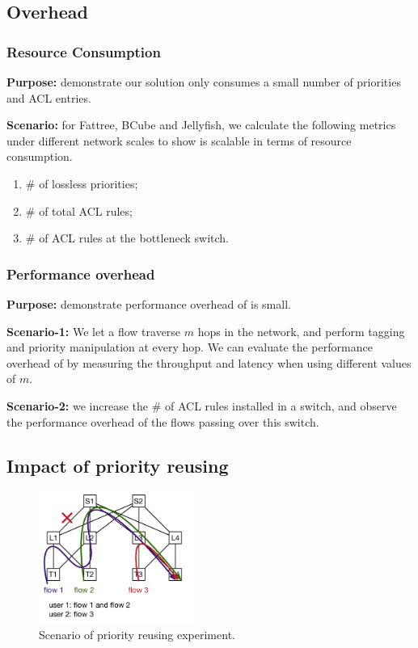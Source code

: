 \subsection{Overhead}\label{subsec:exp_overhead}

\subsubsection{Resource Consumption}\label{subsec:exp_resourceconsump}

\textbf{Purpose:} demonstrate our solution only consumes a small number of priorities and ACL entries.

\textbf{Scenario:} for Fattree, BCube and Jellyfish, we calculate the following metrics under different network scales to show \sysname{} is scalable in terms of resource consumption.
\begin{enumerate}
	\item $\#$ of lossless priorities;
	\item $\#$ of total ACL rules;
 	\item $\#$ of ACL rules at the bottleneck switch.
\end{enumerate}

\subsubsection{Performance overhead}\label{subsec:exp_performanceoverhead}

 \textbf{Purpose:} demonstrate performance overhead of \sysname{} is small.

\textbf{Scenario-1:} We let a flow traverse $m$ hops in the network, and perform tagging and priority manipulation at every hop. We can evaluate the performance overhead of \sysname{} by measuring the throughput and latency when using different values of $m$.

\textbf{Scenario-2:} we increase the $\#$ of ACL rules installed in a switch, and observe the performance overhead of the flows passing over this switch.

\subsection{Impact of priority reusing}\label{subsec:exp_priorityreusing}


\begin{figure}
	\centering
	\includegraphics[width=0.45\textwidth] {figs/priorityreusing_1}
	\caption{Scenario of priority reusing experiment.}\label{fig:exp_priorityreusing}
	
\end{figure}

